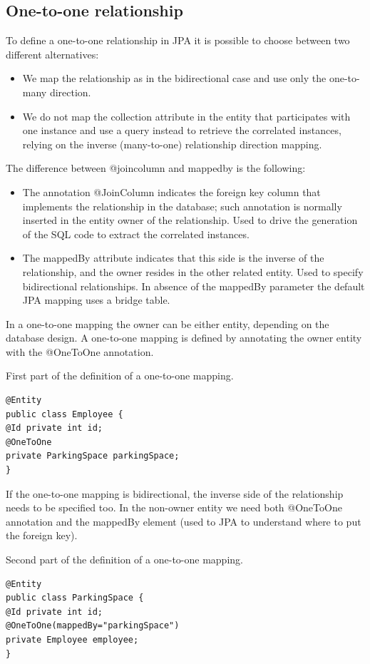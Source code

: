     \subsection*{One-to-one relationship}
    To define a one-to-one relationship in JPA it is possible to choose between two different alternatives: 
    \begin{itemize}
        \item We map the relationship as in the bidirectional case and use only the one-to-many direction. 
        \item We do not map the collection attribute in the entity that participates with one instance and use a query instead to retrieve the correlated instances, 
            relying on the inverse (many-to-one) relationship direction mapping.
    \end{itemize}
    The difference between @joincolumn and mappedby is the following: 
    \begin{itemize}
        \item The annotation @JoinColumn indicates the foreign key column that implements the relationship in the database; such annotation is normally inserted in 
            the entity owner of the relationship. Used to drive the generation of the SQL code to extract the correlated instances.
        \item The mappedBy attribute indicates that this side is the inverse of the relationship, and the owner resides in the other related entity. Used to 
            specify bidirectional relationships. In absence of the mappedBy parameter the default JPA mapping uses a bridge table.
    \end{itemize}
    In a one-to-one mapping the owner can be either entity, depending on the database design. A one-to-one mapping is defined by annotating the owner entity 
    with the @OneToOne annotation.
    \begin{example}
        First part of the definition of a one-to-one mapping. 
        \begin{lstlisting}[style=Java]
@Entity
public class Employee {
@Id private int id;
@OneToOne
private ParkingSpace parkingSpace;
}
        \end{lstlisting}
    \end{example}
    If the one-to-one mapping is bidirectional, the inverse side of the relationship needs to be specified too. In the non-owner entity we need both @OneToOne annotation 
    and the mappedBy element (used to JPA to understand where to put the foreign key).
    \begin{example}
    Second part of the definition of a one-to-one mapping. 
        \begin{lstlisting}[style=Java]
@Entity
public class ParkingSpace {
@Id private int id;
@OneToOne(mappedBy="parkingSpace")
private Employee employee;
}
        \end{lstlisting}
    \end{example}

